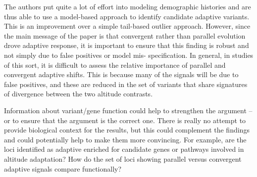 \documentclass[onecolumn,oneside,letterpaper]{article}
\begin{document}
The authors put quite a lot of effort into modeling demographic histories and are thus able to use a model-based approach to identify candidate adaptive variants.  This is an improvement over a simple tail-based outlier approach.  However, since the main message of the paper is that convergent rather than parallel evolution drove adaptive response, it is important to ensure that this finding is robust and not simply due to false positives or model mis- specification.  In general, in studies of this sort, it is difficult to assess the relative importance of parallel and convergent adaptive shifts. This is because many of the signals will be due to false positives, and these are reduced in the set of variants that share signatures of divergence between the two altitude contrasts.  

Information about variant/gene function could help to strengthen the argument -- or to ensure that the argument is the correct one.  There is really no attempt to provide biological context for the results, but this could complement the findings and could potentially help to make them more convincing.  For example, are the loci identified as adaptive enriched for candidate genes or pathways involved in altitude adaptation? How do the set of loci showing parallel versus convergent adaptive signals compare functionally?   
\end{document}
